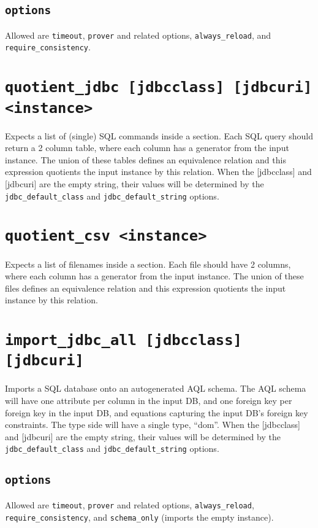 \documentclass[10pt]{book}
\begin{document}
\subsection{{\tt options}}
Allowed are {\tt timeout}, {\tt prover} and related options, {\tt always\_reload}, and {\tt require\_consistency}.  


\section{{\tt quotient\_jdbc [jdbcclass] [jdbcuri] <instance>}}
Expects a list of (single) SQL commands inside a section.  Each SQL query should return a 2 column table, where each column has a generator from the input instance.  The union of these tables defines an equivalence relation and this expression quotients the input instance by this relation.  When the [jdbcclass] and [jdbcuri] are the empty string, their values will be determined by the {\tt jdbc\_default\_class} and {\tt jdbc\_default\_string} options.

\section{{\tt quotient\_csv <instance>}}
Expects a list of filenames inside a section.  Each file should have 2 columns, where each column has a generator from the input instance.  The union of these files defines an equivalence relation and this expression quotients the input instance by this relation. 

\section{{\tt import\_jdbc\_all [jdbcclass] [jdbcuri]}}

Imports a SQL database onto an autogenerated AQL schema.  The AQL schema will have one attribute per column in the input DB, and one foreign key per foreign key in the input DB, and equations capturing the input DB's foreign key constraints.  The type side will have a single type, ``dom''.  When the [jdbcclass] and [jdbcuri] are the empty string, their values will be determined by the {\tt jdbc\_default\_class} and {\tt jdbc\_default\_string} options.

\subsection{{\tt options}}
Allowed are {\tt timeout}, {\tt prover} and related options, {\tt always\_reload}, {\tt require\_consistency}, and {\tt schema\_only} (imports the empty instance).
\end{document}
